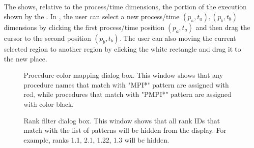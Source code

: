 \subsection{\miniview}
\label{sec:miniview}

The \miniview{} shows, relative to the process/time dimensions, the portion of the execution shown by the \traceview.
In \miniview{}, the user can select a new process/time $(p_a,t_a),(p_b,t_b)$ dimensions by clicking the first process/time position $(p_a,t_a)$ and then drag the cursor to the second position $(p_b,t_b)$.
The user can also moving the current selected region to another region by clicking the white rectangle and drag it to the new place.



\begin{figure}[t]
\caption{Procedure-color mapping dialog box. This window shows that any procedure names that match with "MPI*" pattern are assigned with red, while procedures that match with "PMPI*" pattern are assigned with color black.}
\label{fig:hpctraceviewer-mapping}
\end{figure}

\begin{figure}[t]
\caption{Rank filter dialog box. This window shows that all rank IDs that match with the list of patterns will be hidden from the display. For example, ranks 1.1, 2.1, 1.22, 1.3 will be hidden.}
\label{fig:hpctraceviewer-filter}
\end{figure}


